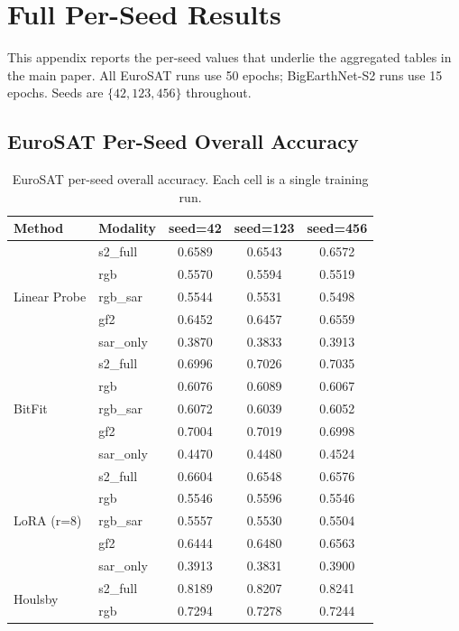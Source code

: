 \documentclass[11pt]{article}
\begin{document}
\section{Full Per-Seed Results}
\label{app:per-seed}

This appendix reports the per-seed values that underlie the aggregated tables in the main paper. All EuroSAT runs use 50 epochs; BigEarthNet-S2 runs use 15 epochs. Seeds are $\{42, 123, 456\}$ throughout.

\subsection{EuroSAT Per-Seed Overall Accuracy}

\begin{table}[h]
\centering
\small
\caption{EuroSAT per-seed overall accuracy. Each cell is a single training run.}
\label{tab:eurosat-per-seed}
\begin{tabular}{llccc}
\toprule
Method & Modality & seed=42 & seed=123 & seed=456 \\
\midrule
\multirow{5}{*}{Linear Probe}
 & s2\_full   & 0.6589 & 0.6543 & 0.6572 \\
 & rgb        & 0.5570 & 0.5594 & 0.5519 \\
 & rgb\_sar   & 0.5544 & 0.5531 & 0.5498 \\
 & gf2        & 0.6452 & 0.6457 & 0.6559 \\
 & sar\_only  & 0.3870 & 0.3833 & 0.3913 \\
\midrule
\multirow{5}{*}{BitFit}
 & s2\_full   & 0.6996 & 0.7026 & 0.7035 \\
 & rgb        & 0.6076 & 0.6089 & 0.6067 \\
 & rgb\_sar   & 0.6072 & 0.6039 & 0.6052 \\
 & gf2        & 0.7004 & 0.7019 & 0.6998 \\
 & sar\_only  & 0.4470 & 0.4480 & 0.4524 \\
\midrule
\multirow{5}{*}{LoRA (r=8)}
 & s2\_full   & 0.6604 & 0.6548 & 0.6576 \\
 & rgb        & 0.5546 & 0.5596 & 0.5546 \\
 & rgb\_sar   & 0.5557 & 0.5530 & 0.5504 \\
 & gf2        & 0.6444 & 0.6480 & 0.6563 \\
 & sar\_only  & 0.3913 & 0.3831 & 0.3900 \\
\midrule
\multirow{5}{*}{Houlsby}
 & s2\_full   & 0.8189 & 0.8207 & 0.8241 \\
 & rgb        & 0.7294 & 0.7278 & 0.7244 \\

\end{tabular}
\end{table}
\end{document}
